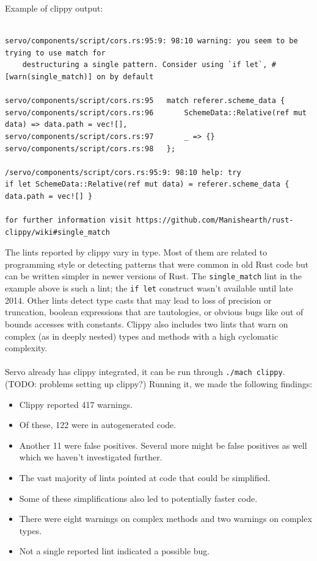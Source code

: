 \documentclass{scrartcl}
\newcommand{\todo}[1] {{\color{red}(TODO: #1)}}
\begin{document}
Example of clippy output:
{
\scriptsize
\begin{verbatim}

servo/components/script/cors.rs:95:9: 98:10 warning: you seem to be trying to use match for
    destructuring a single pattern. Consider using `if let`, #[warn(single_match)] on by default
    
servo/components/script/cors.rs:95   match referer.scheme_data {
servo/components/script/cors.rs:96       SchemeData::Relative(ref mut data) => data.path = vec![],
servo/components/script/cors.rs:97       _ => {}
servo/components/script/cors.rs:98   };

/servo/components/script/cors.rs:95:9: 98:10 help: try
if let SchemeData::Relative(ref mut data) = referer.scheme_data { data.path = vec![] }

for further information visit https://github.com/Manishearth/rust-clippy/wiki#single_match

\end{verbatim}
}

The lints reported by clippy vary in type. Most of them are related to programming style or detecting patterns that were common in old Rust code but can be written simpler in newer versions of Rust. The \texttt{single\_match} lint in the example above is such a lint; the \texttt{if let} construct wasn't available until late 2014. Other lints detect type casts that may lead to loss of precision or truncation, boolean expressions that are tautologies, or obvious bugs like out of bounds accesses with constants. Clippy also includes two lints that warn on complex (as in deeply nested) types and methods with a high cyclomatic complexity.\\
\\
Servo already has clippy integrated, it can be run through \texttt{./mach clippy}. \todo{problems setting up clippy?} Running it, we made the following findings: 
\begin{itemize}
	\item Clippy reported 417 warnings.
    \item Of these, 122 were in autogenerated code.
    \item Another 11 were false positives. Several more might be false positives as well which we haven't investigated further.
    \item The vast majority of lints pointed at code that could be simplified.
    \item Some of these simplifications also led to potentially faster code.
    \item There were eight warnings on complex methods and two warnings on complex types.
    \item Not a single reported lint indicated a possible bug.
\end{itemize}
\end{document}
